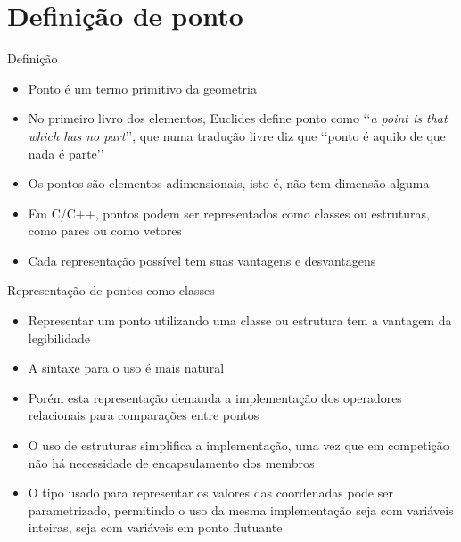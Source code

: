 \section{Definição de ponto}

\begin{frame}[fragile]{Definição}

    \begin{itemize}
        \item Ponto é um termo primitivo da geometria
        \pause

        \item No primeiro livro dos elementos, Euclides define ponto como 
            \lq\lq \textit{a point is that which has no part}\rq\rq, que numa tradução livre 
            diz que \lq\lq ponto é aquilo de que nada é parte\rq\rq
        \pause

        \item Os pontos são elementos adimensionais, isto é, não tem dimensão alguma
        \pause

        \item Em C/C++, pontos podem ser representados como classes ou estruturas, como
            pares ou como vetores
        \pause

        \item Cada representação possível tem suas vantagens e desvantagens
   \end{itemize}

\end{frame}

\begin{frame}[fragile]{Representação de pontos como classes}

    \begin{itemize}
        \item Representar um ponto utilizando uma classe ou estrutura tem a vantagem da 
            legibilidade 
        \pause

        \item A sintaxe para o uso é mais natural
        \pause

        \item Porém esta representação demanda a implementação dos operadores relacionais 
            para comparações entre pontos
        \pause

        \item O uso de estruturas simplifica a implementação, uma vez que em competição não há
            necessidade de encapsulamento dos membros
        \pause

        \item O tipo usado para representar os valores das coordenadas pode ser parametrizado,
            permitindo o uso da mesma implementação seja com variáveis inteiras, seja com variáveis
            em ponto flutuante 
    \end{itemize}

\end{frame}


